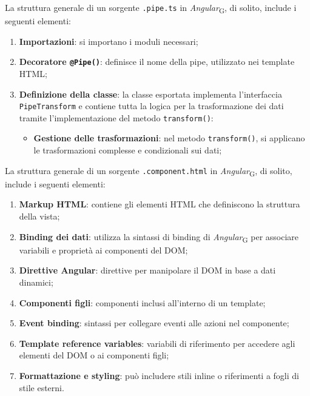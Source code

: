 La struttura generale di un sorgente \texttt{.pipe.ts} in \textit{Angular}\textsubscript{G}, di solito, include i seguenti elementi:
\begin{enumerate}
    \item \textbf{Importazioni}: si importano i moduli necessari;
    \item \textbf{Decoratore \texttt{@Pipe()}}: definisce il nome della pipe, utilizzato nei template HTML;
    \item \textbf{Definizione della classe}: la classe esportata implementa l'interfaccia \\ \texttt{PipeTransform} e contiene tutta la logica per la trasformazione dei dati tramite l'implementazione del metodo \texttt{transform()}:
    \begin{itemize}
        \item \textbf{Gestione delle trasformazioni}: nel metodo \texttt{transform()}, si applicano le trasformazioni complesse e condizionali sui dati;
    \end{itemize}
\end{enumerate}

La struttura generale di un sorgente \texttt{.component.html} in \textit{Angular}\textsubscript{G}, di solito, include i seguenti elementi:
\begin{enumerate}
    \item \textbf{Markup HTML}: contiene gli elementi HTML che definiscono la struttura della vista;
    \item \textbf{Binding dei dati}: utilizza la sintassi di binding di \textit{Angular}\textsubscript{G} per associare variabili e proprietà ai componenti del DOM;
    \item \textbf{Direttive Angular}: direttive per manipolare il DOM in base a dati dinamici;
    \item \textbf{Componenti figli}: componenti inclusi all'interno di un template;
    \item \textbf{Event binding}: sintassi per collegare eventi alle azioni nel componente;
    \item \textbf{Template reference variables}: variabili di riferimento per accedere agli elementi del DOM o ai componenti figli;
    \item \textbf{Formattazione e styling}: può includere stili inline o riferimenti a fogli di stile esterni.
\end{enumerate}

